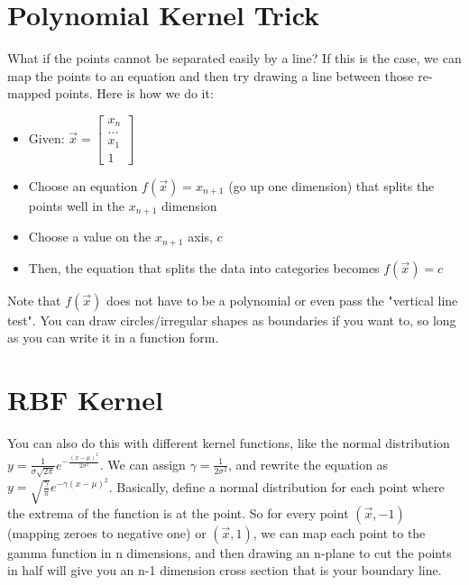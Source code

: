 \documentclass{article}
\begin{document}
\section{Polynomial Kernel Trick}
What if the points cannot be separated easily by a line? If this is the case, we can map the points to an equation and then try drawing a line between those re-mapped points. Here is how we do it:
\begin{itemize}
	\item Given: $\vec{x} = \begin{bmatrix} x_n \\ ... \\ x_1 \\ 1\end{bmatrix}$
	\item Choose an equation $f(\vec{x}) = x_{n+1}$ (go up one dimension) that splits the points well in the $x_{n+1}$ dimension
	\item Choose a value on the $x_{n+1}$ axis, $c$
	\item Then, the equation that splits the data into categories becomes $f(\vec{x}) = c$
\end{itemize}

Note that $f(\vec{x})$ does not have to be a polynomial or even pass the "vertical line test". You can draw circles/irregular shapes as boundaries if you want to, so long as you can write it in a function form. 

\section{RBF Kernel}
You can also do this with different kernel functions, like the normal distribution $y = \frac{1}{\sigma \sqrt{2\pi}} e^{-\frac{(x-\mu)^2}{2\sigma^2}}$. We can assign $\gamma = \frac{1}{2\sigma^2}$, and rewrite the equation as $y = \sqrt{\frac{\gamma}{\pi}} e^{-\gamma(x-\mu)^2}$. Basically, define a normal distribution for each point where the extrema of the function is at the point. So for every point $(\vec{x}, -1)$ (mapping zeroes to negative one) or $(\vec{x}, 1)$, we can map each point to the gamma function in n dimensions, and then drawing an n-plane to cut the points in half will give you an n-1 dimension cross section that is your boundary line.   
\end{document}
